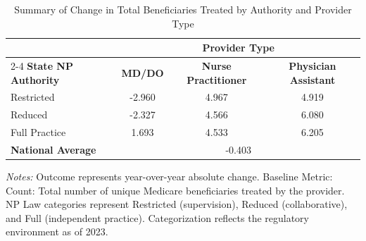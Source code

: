 \begin{table}[htbp]
    \centering
    \caption{Summary of Change in Total Beneficiaries Treated by Authority and Provider Type}
    \label{tab:d_tot_benes}
    \vspace{0.2cm}
    \begin{tabular}{lccc}
        \toprule
        & \multicolumn{3}{c}{\textbf{Provider Type}} \\
        \cmidrule(lr){2-4}
        \textbf{State NP Authority} & \textbf{MD/DO} & \textbf{Nurse Practitioner} & \textbf{Physician Assistant} \\
        \midrule
        Restricted & -2.960 & 4.967 & 4.919 \\
        Reduced & -2.327 & 4.566 & 6.080 \\
        Full Practice & 1.693 & 4.533 & 6.205 \\
        \midrule
        \textbf{National Average} & \multicolumn{3}{c}{-0.403} \\
        \bottomrule
    \end{tabular}
    \vspace{0.1cm}
    \begin{minipage}{0.85\textwidth}
        \footnotesize \textit{Notes:} Outcome represents year-over-year absolute change. Baseline Metric: Count: Total number of unique Medicare beneficiaries treated by the provider. NP Law categories represent Restricted (supervision), Reduced (collaborative), and Full (independent practice). Categorization reflects the regulatory environment as of 2023.
    \end{minipage}
\end{table}